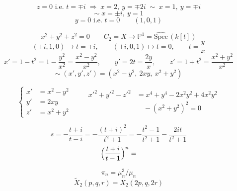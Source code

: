\documentclass[11pt,a4paper]{article}
\begin{document}
\[
  z = 0 \text{ i.e. } t = \mp i \;\Longrightarrow\; x = 2,\ y = \mp 2i \;\sim\; x = 1,\ y = \mp i
\]
\[
  \sim\; x = \pm i,\ y = 1
\]
\[
  y = 0 \text{ i.e. } t = 0 \qquad (1, 0, 1)
\]

\[
  x^2 + y^2 + z^2 = 0 \qquad C_2 = X \longrightarrow \mathbb{P}^1 = \widehat{\mathrm{Spec}}\,(k[t])
\]
\[
  (\pm i, 1, 0) \longrightarrow t = \mp i, \qquad
  (\pm i, 0, 1) \longmapsto t = 0, \qquad
  t = \frac{y}{x}
\]
\[
  x' = 1 - t^2 = 1 - \frac{y^2}{x^2} = \frac{x^2 - y^2}{x^2}, \qquad
  y' = 2t = \frac{2y}{x}, \qquad
  z' = 1 + t^2 = \frac{x^2 + y^2}{x^2}
\]
\[
  \sim\; (x', y', z') = (x^2 - y^2,\ 2xy,\ x^2 + y^2)
\]

\[
  \left\{
  \begin{aligned}
    x' &= x^2 - y^2 \\
    y' &= 2xy \\
    z' &= x^2 + y^2
  \end{aligned}
  \right.
  \qquad
  \begin{aligned}
    x'^2 + y'^2 - z'^2 &= x^4 + y^4 - 2x^2y^2 + 4x^2y^2 \\
    &\quad - (x^2 + y^2)^2 = 0
  \end{aligned}
\]


\[
  s = -\frac{t + i}{t - i} = -\frac{(t + i)^2}{t^2 + 1}
  = -\frac{t^2 - 1}{t^2 + 1} - \frac{2it}{t^2 + 1}
\]
\[
  \Bigl(\frac{t + i}{t - 1}\Bigr)^{n} =
\]

\[
  \pi_n = \mu_n^{3} / \mu_n
\]
\[
  \widetilde{X}_2(p, q, r) = X_2(2p, q, 2r)
\]
\end{document}
